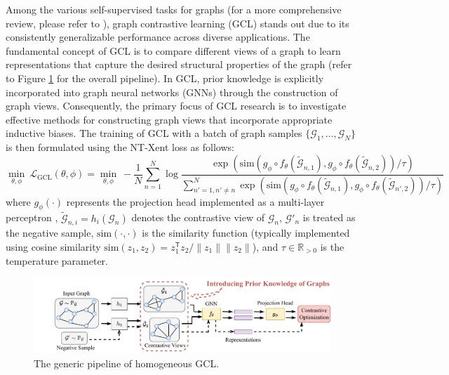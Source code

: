 \documentclass[11pt]{article}
\begin{document}
Among the various self-supervised tasks for graphs (for a more comprehensive review, please refer to \cite{xie2022self, liu2022graph}), graph contrastive learning (GCL) \cite{you2020graph, velickovic2019deep, zhu2020deep, hassani2020contrastive, sun2019infograph, qiu2020gcc} stands out due to its consistently generalizable performance across diverse applications. The fundamental concept of GCL is to compare different views of a graph to learn representations that capture the desired structural properties of the graph (refer to Figure \ref{fig:graphcl} for the overall pipeline). In GCL, prior knowledge is explicitly incorporated into graph neural networks (GNNs) through the construction of graph views. Consequently, the primary focus of GCL research is to investigate effective methods for constructing graph views that incorporate appropriate inductive biases.
The training of GCL with a batch of graph samples $\{\mathcal{G}_1, ..., \mathcal{G}_N\}$ is then formulated using the NT-Xent loss \cite{chen2020simple} as follows:
\begin{equation}
    \min_{\theta, \phi} \ \mathcal{L}_\mathrm{GCL}(\theta, \phi) = \min_{\theta, \phi} \ - \frac{1}{N} \sum_{n=1}^N \log \frac{\exp\left(\mathrm{sim}\left(g_\phi \circ f_\theta (\tilde{\mathcal{G}}_{n,1}), g_\phi \circ f_\theta (\tilde{\mathcal{G}}_{n,2})\right)  / \tau\right)}{\sum_{n'=1, n' \neq n}^N \exp\left(\mathrm{sim}\left(g_\phi \circ f_\theta (\tilde{\mathcal{G}}_{n,1}), g_\phi \circ f_\theta (\tilde{\mathcal{G}}_{n',2})\right)  / \tau\right)}
\end{equation}
where $g_\phi(\cdot)$ represents the projection head implemented as a multi-layer perceptron \cite{chen2020simple}, $\tilde{\mathcal{G}}_{n,i} = h_i(\mathcal{G}_n)$ denotes the contrastive view of $\mathcal{G}_n$, $\mathcal{G}'_n$ is treated as the negative sample, $\mathrm{sim}(\cdot, \cdot)$ is the similarity function (typically implemented using cosine similarity $\mathrm{sim}(z_1, z_2) = z_1^\mathsf{T} z_2 / \lVert z_1 \rVert \lVert z_2 \rVert$), and $\tau \in \mathbb{R}_{>0}$ is the temperature parameter.
\begin{figure}[t] 
    \centering 
    \includegraphics[width=1\linewidth]{submissions/Yan2023/figures/graphcl.drawio.pdf}
    \caption{The generic pipeline of homogeneous GCL.} 
    \label{fig:graphcl}
\end{figure}
\end{document}
